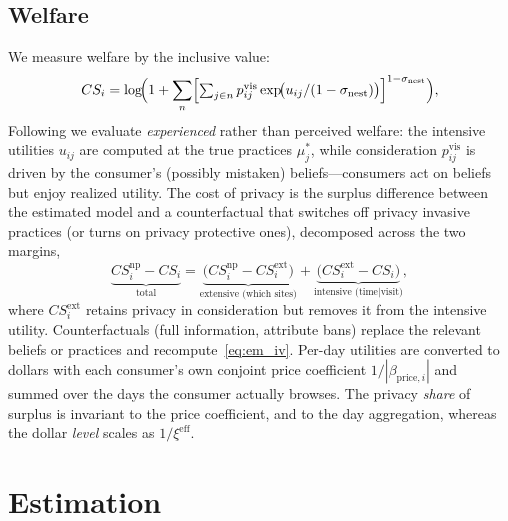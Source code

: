 \documentclass[12pt]{article}
\theoremstyle{definition}
\theoremstyle{remark}
\begin{document}
\subsection{Welfare}\label{sec:em_welfare}

We measure welfare by the inclusive value:
\begin{equation}\label{eq:em_iv}
  CS_i = \log\!\Bigl(1 + \sum_{n} \Bigl[\textstyle\sum_{j \in n} p^{\text{vis}}_{ij} \exp\!\bigl(u_{ij}/(1 - \sigma_{\text{nest}})\bigr)\Bigr]^{1 - \sigma_{\text{nest}}}\Bigr),
\end{equation}
Following \citet{train2015} we evaluate \emph{experienced} rather than perceived welfare: the intensive utilities $u_{ij}$ are computed at the true practices $\mu^*_j$, while consideration $p^{\text{vis}}_{ij}$ is driven by the consumer's (possibly mistaken) beliefs---consumers act on beliefs but enjoy realized utility. The cost of privacy is the surplus difference between the estimated model and a counterfactual that switches off privacy invasive practices (or turns on privacy protective ones), decomposed across the two margins,
\begin{equation*}
  \underbrace{CS^{\text{np}}_i - CS_i}_{\text{total}} = \underbrace{\bigl(CS^{\text{np}}_i - CS^{\text{ext}}_i\bigr)}_{\text{extensive (which sites)}} + \underbrace{\bigl(CS^{\text{ext}}_i - CS_i\bigr)}_{\text{intensive (time} \mid \text{visit)}},
\end{equation*}
where $CS^{\text{ext}}_i$ retains privacy in consideration but removes it from the intensive utility. Counterfactuals (full information, attribute bans) replace the relevant beliefs or practices and recompute~\eqref{eq:em_iv}. Per-day utilities are converted to dollars with each consumer's own conjoint price coefficient $1/|\beta_{\text{price},i}|$ and summed over the days the consumer actually browses. The privacy \emph{share} of surplus is invariant to the price coefficient, and to the day aggregation, whereas the dollar \emph{level} scales as $1/\xi^{\text{eff}}$.

\section{Estimation}\label{sec:estimation}
\end{document}
